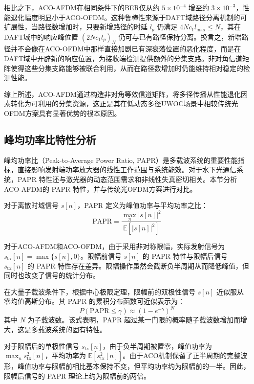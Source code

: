 相比之下，ACO-AFDM在相同条件下的BER仅从约 $5\times10^{-4}$ 增至约 $3\times10^{-3}$，性能退化幅度明显小于ACO-OFDM。这种鲁棒性来源于DAFT域路径分离机制的可扩展性，当路径数增加时，只要新增路径的时延 $l_p$ 仍满足 $4Nc_1 l_{\max} \leq N$，其在DAFT域中的响应峰位置 $(2Nc_1 l_p)_N$ 仍可与已有路径保持分离。换言之，新增路径并不会像在ACO-OFDM中那样直接加剧已有深衰落位置的恶化程度，而是在DAFT域中开辟新的响应位置，为接收端检测提供额外的分集支路。非对角信道矩阵使得这些分集支路能够被联合利用，从而在路径数增加时仍能维持相对稳定的检测性能。

综上所述，ACO-AFDM通过构造非对角等效信道矩阵，将多径传播从性能退化因素转化为可利用的分集资源，这正是其在低动态多径UWOC场景中相较传统光OFDM方案具有显著优势的根本原因。

\subsection{峰均功率比特性分析}
\label{subsec:papr_analysis}

峰均功率比（Peak-to-Average Power Ratio, PAPR）是多载波系统的重要性能指标，直接影响发射端功率放大器的线性工作范围与系统能效。对于水下光通信系统，PAPR 特性还与激光器的动态范围需求和非线性失真密切相关。本节分析ACO-AFDM的 PAPR 特性，并与传统光OFDM方案进行对比。


对于离散时域信号 $s[n]$，PAPR 定义为峰值功率与平均功率之比：
\begin{equation}
\mathrm{PAPR} = \frac{\max_{n} |s[n]|^2}{\mathbb{E}[|s[n]|^2]}
\end{equation}

对于ACO-AFDM和ACO-OFDM，由于采用非对称限幅，实际发射信号为 $s_{\mathrm{tx}}[n] = \max\{s[n], 0\}$。限幅前信号 $s[n]$ 的 PAPR 特性与限幅后信号 $s_{\mathrm{tx}}[n]$ 的 PAPR 特性存在差异。限幅操作虽然会截断负半周期从而降低峰值，但同时也改变了信号的统计分布。

在大量子载波条件下，根据中心极限定理，限幅前的双极性信号 $s[n]$ 近似服从零均值高斯分布。其 PAPR 的累积分布函数可近似表示为：
\begin{equation}
P(\mathrm{PAPR} \leq \gamma) \approx \left(1 - e^{-\gamma}\right)^N
\end{equation}
其中 $N$ 为子载波数。该式表明，PAPR 超过某一门限的概率随子载波数增加而增大，这是多载波系统的固有特性。

对于限幅后的单极性信号 $s_{\mathrm{tx}}[n]$，由于负半周期被置零，峰值功率为 $\max_n s_{\mathrm{tx}}^2[n]$，平均功率为 $\mathbb{E}[s_{\mathrm{tx}}^2[n]]$。由于ACO机制保留了正半周期的完整波形，峰值功率与限幅前相比基本保持不变，但平均功率约为限幅前的一半。因此，限幅后信号的 PAPR 理论上约为限幅前的两倍。


